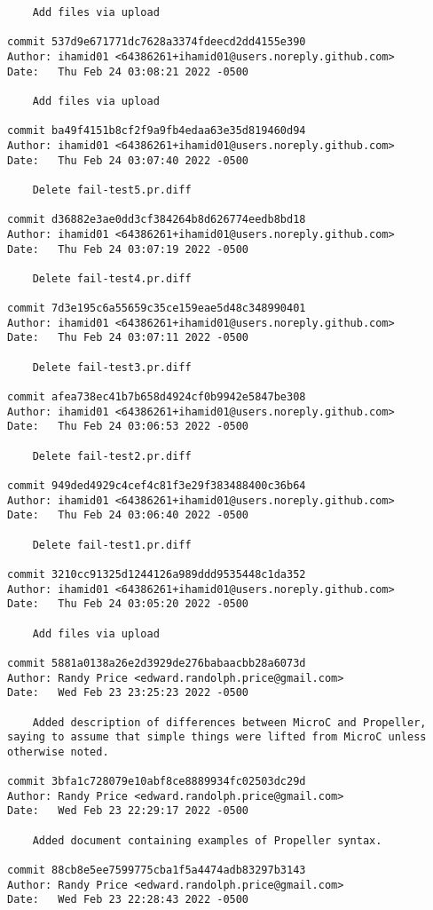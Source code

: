 {\begin{verbatim}
    Add files via upload

commit 537d9e671771dc7628a3374fdeecd2dd4155e390
Author: ihamid01 <64386261+ihamid01@users.noreply.github.com>
Date:   Thu Feb 24 03:08:21 2022 -0500

    Add files via upload

commit ba49f4151b8cf2f9a9fb4edaa63e35d819460d94
Author: ihamid01 <64386261+ihamid01@users.noreply.github.com>
Date:   Thu Feb 24 03:07:40 2022 -0500

    Delete fail-test5.pr.diff

commit d36882e3ae0dd3cf384264b8d626774eedb8bd18
Author: ihamid01 <64386261+ihamid01@users.noreply.github.com>
Date:   Thu Feb 24 03:07:19 2022 -0500

    Delete fail-test4.pr.diff

commit 7d3e195c6a55659c35ce159eae5d48c348990401
Author: ihamid01 <64386261+ihamid01@users.noreply.github.com>
Date:   Thu Feb 24 03:07:11 2022 -0500

    Delete fail-test3.pr.diff

commit afea738ec41b7b658d4924cf0b9942e5847be308
Author: ihamid01 <64386261+ihamid01@users.noreply.github.com>
Date:   Thu Feb 24 03:06:53 2022 -0500

    Delete fail-test2.pr.diff

commit 949ded4929c4cef4c81f3e29f383488400c36b64
Author: ihamid01 <64386261+ihamid01@users.noreply.github.com>
Date:   Thu Feb 24 03:06:40 2022 -0500

    Delete fail-test1.pr.diff

commit 3210cc91325d1244126a989ddd9535448c1da352
Author: ihamid01 <64386261+ihamid01@users.noreply.github.com>
Date:   Thu Feb 24 03:05:20 2022 -0500

    Add files via upload

commit 5881a0138a26e2d3929de276babaacbb28a6073d
Author: Randy Price <edward.randolph.price@gmail.com>
Date:   Wed Feb 23 23:25:23 2022 -0500

    Added description of differences between MicroC and Propeller, saying to assume that simple things were lifted from MicroC unless otherwise noted.

commit 3bfa1c728079e10abf8ce8889934fc02503dc29d
Author: Randy Price <edward.randolph.price@gmail.com>
Date:   Wed Feb 23 22:29:17 2022 -0500

    Added document containing examples of Propeller syntax.

commit 88cb8e5ee7599775cba1f5a4474adb83297b3143
Author: Randy Price <edward.randolph.price@gmail.com>
Date:   Wed Feb 23 22:28:43 2022 -0500


\end{verbatim}}
